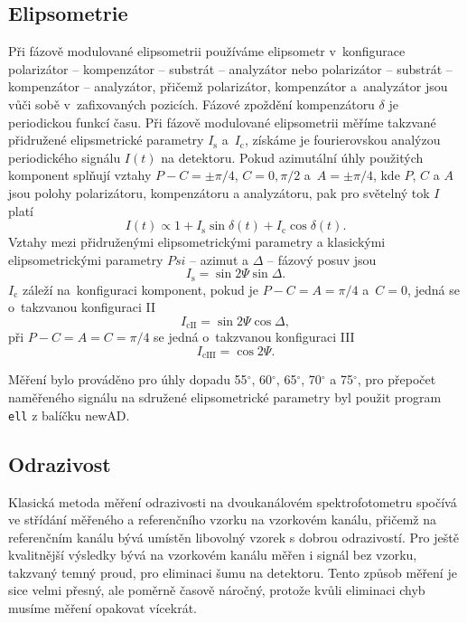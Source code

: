 \subsection{Elipsometrie}
Při fázově modulované elipsometrii používáme elipsometr v~konfigurace polarizátor -- kompenzátor -- substrát -- analyzátor nebo polarizátor -- substrát -- kompenzátor -- analyzátor, přičemž polarizátor, kompenzátor a~analyzátor jsou vůči sobě v~zafixovaných pozicích. Fázové zpoždění kompenzátoru $\delta$ je periodickou funkcí času. Při fázově modulované elipsometrii měříme takzvané přidružené elipsmetrické parametry $I_\mathrm{s}$ a~$I_{\mathrm{c}}$, získáme je fourierovskou analýzou periodického signálu $I(t)$ na detektoru. Pokud azimutální úhly použitých komponent splňují vztahy $P - C = \pm \pi/4$, $C=0, \pi/2$ a~$A = \pm \pi/4$, kde $P$, $C$ a $A$ jsou polohy polarizátoru, kompenzátoru a analyzátoru, pak pro světelný tok $I$ platí \cite{Ohlidal2000}
%
\begin{equation} I(t) \propto 1 + I_\mathrm{s} \sin{\delta(t)} + I_\mathrm{c} \cos{\delta(t)} \mathrm{.}\end{equation}
%
Vztahy mezi přidruženými elipsometrickými parametry a klasickými elipsometrickými parametry $Psi$ -- azimut a $\Delta$ -- fázový posuv jsou  
\begin{equation} I_\mathrm{s} = \sin{2\Psi} \sin{\Delta} \mathrm{.}\end{equation}
$I_{\mathrm{c}}$ záleží na~konfiguraci komponent, pokud je $P - C = A = \pi/4$ a~$ C = 0 $, jedná se o~takzvanou konfiguraci II
\begin{equation} I_\mathrm{cII} = \sin{2\Psi} \cos{\Delta} \mathrm{,}\end{equation} 
při $P - C = A = C = \pi/4$ se jedná o~takzvanou konfiguraci III
\begin{equation} I_\mathrm{cIII} = \cos{2\Psi} \mathrm{.}\end{equation}

Měření bylo prováděno pro úhly dopadu 55$^\circ$, 60$^\circ$, 65$^\circ$, 70$^\circ$ a 75$^\circ$, pro přepočet naměřeného signálu na sdružené elipsometrické parametry byl použit program \texttt{ell} z balíčku newAD.

\subsection{Odrazivost}
Klasická metoda měření odrazivosti na dvoukanálovém spektrofotometru spočívá ve stří\-dá\-ní měřeného a referenčního vzorku na vzorkovém kanálu, přičemž na referenčním kanálu bývá umístěn libovolný vzorek s dobrou odrazivostí. 
Pro ještě kvalitnější výsledky bývá na vzorkovém kanálu měřen i signál bez vzorku, takzvaný temný proud, pro eliminaci šumu na detektoru. Tento způsob měření je sice velmi přesný, ale poměrně časově náročný, protože kvůli eliminaci chyb musíme měření opakovat vícekrát.


